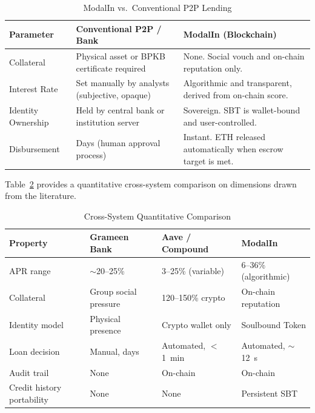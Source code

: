 \documentclass[conference]{IEEEtran}
\begin{document}
\begin{table}[t]
\caption{ModalIn vs.\ Conventional P2P Lending}
\label{tab:comparison}
\centering
\begin{tabular}{p{1.5cm}p{2.3cm}p{2.3cm}}
\toprule
\textbf{Parameter} & \textbf{Conventional P2P / Bank} & \textbf{ModalIn (Blockchain)} \\
\midrule
Collateral
  & Physical asset or BPKB certificate required
  & None. Social vouch and on-chain reputation only. \\[2pt]
Interest Rate
  & Set manually by analysts (subjective, opaque)
  & Algorithmic and transparent, derived from on-chain score. \\[2pt]
Identity Ownership
  & Held by central bank or institution server
  & Sovereign. SBT is wallet-bound and user-controlled. \\[2pt]
Disbursement
  & Days (human approval process)
  & Instant. ETH released automatically when escrow target is met. \\
\bottomrule
\end{tabular}
\end{table}

Table~\ref{tab:crosssystem} provides a quantitative cross-system comparison
on dimensions drawn from the literature.

\begin{table}[t]
\caption{Cross-System Quantitative Comparison}
\label{tab:crosssystem}
\centering
\begin{tabular}{p{1.4cm}p{1.45cm}p{1.45cm}p{1.55cm}}
\toprule
\textbf{Property}
  & \textbf{Grameen Bank~\cite{b13}}
  & \textbf{Aave / Compound~\cite{b7}}
  & \textbf{ModalIn} \\
\midrule
APR range
  & $\sim$20--25\%
  & 3--25\% (variable)
  & 6--36\% (algorithmic) \\[2pt]
Collateral
  & Group social pressure
  & 120--150\% crypto
  & On-chain reputation \\[2pt]
Identity model
  & Physical presence
  & Crypto wallet only
  & Soulbound Token \\[2pt]
Loan decision
  & Manual, days
  & Automated, $<$1~min
  & Automated, $\sim$12~s \\[2pt]
Audit trail
  & None
  & On-chain
  & On-chain \\[2pt]
Credit history portability
  & None
  & None
  & Persistent SBT \\
\bottomrule
\end{tabular}
\end{table}
\end{document}
